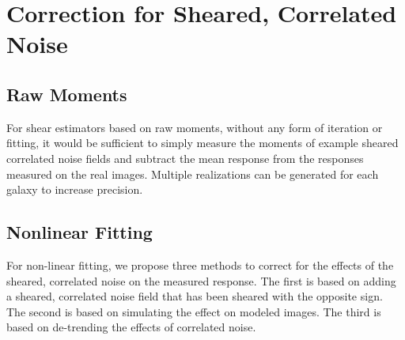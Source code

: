 \documentclass[usegraphicx,usenatbib]{mn2e}
\begin{document}

\section{Correction for Sheared, Correlated Noise} \label{sec:corr}

\subsection{Raw Moments}

For shear estimators based on raw moments, without any form of iteration or
fitting, it would be sufficient to simply measure the moments of example
sheared correlated noise fields and subtract the mean response from the
responses measured on the real images.  Multiple realizations can be generated
for each galaxy to increase precision.


\subsection{Nonlinear Fitting}

For non-linear fitting, we propose three methods to correct for the effects of
the sheared, correlated noise on the measured response.  The first is based on
adding a sheared, correlated noise field that has been sheared with the
opposite sign.  The second is based on simulating the effect on modeled images.
The third is based on de-trending the effects of correlated noise.
\end{document}
